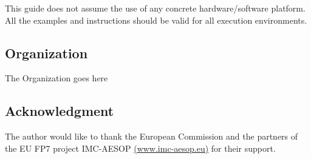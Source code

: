 This guide does not assume the use of any concrete hardware/software platform. All the examples and instructions
should be valid for all execution environments.

\subsection{Organization}
\label{sec:organization}

The Organization goes here

\subsection{Acknowledgment}
\label{sec:acknowledgment}
The author would like to thank the European Commission
and the partners of the EU FP7 project IMC-AESOP \href{http://www.imc-aesop.eu}{(www.imc-aesop.eu)}
for their support.